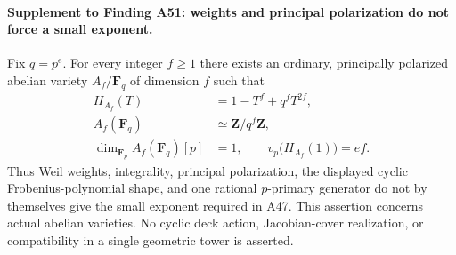 \paragraph{Supplement to Finding A51: weights and principal polarization do not force a small exponent.}
Fix $q=p^e$. For every integer $f\ge1$ there exists an ordinary,
principally polarized abelian variety $A_f/\mathbf F_q$ of dimension
$f$ such that
\[
 \begin{aligned}
 H_{A_f}(T)&=1-T^f+q^fT^{2f},\\
 A_f(\mathbf F_q)&\simeq\mathbf Z/q^f\mathbf Z,\\
 \dim_{\mathbf F_p}A_f(\mathbf F_q)[p]&=1,
 \qquad v_p\bigl(H_{A_f}(1)\bigr)=ef.
 \end{aligned}
 \tag{WV.1}
\]
Thus Weil weights, integrality, principal polarization, the displayed
cyclic Frobenius-polynomial shape, and one rational $p$-primary
generator do not by themselves give the small exponent required in
A47. This assertion concerns actual abelian varieties. No cyclic
deck action, Jacobian-cover realization, or compatibility in a
single geometric tower is asserted.

